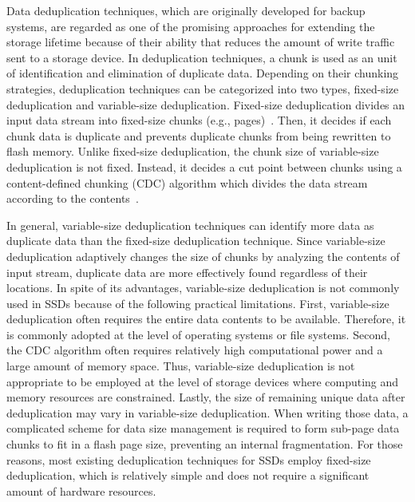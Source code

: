 Data deduplication techniques, which are originally developed for backup systems,
are regarded as one of the promising approaches for extending the storage lifetime
because of their ability that reduces the amount of write traffic sent to a storage device.
In deduplication techniques, a chunk is used as an unit of identification and elimination of duplicate data.
Depending on their chunking strategies, deduplication techniques can be categorized into two types,
fixed-size deduplication and variable-size deduplication.
Fixed-size deduplication divides an input data stream into fixed-size chunks (e.g., pages)~\cite{caftl,value-locality}. %
Then, it decides if each chunk data is duplicate and prevents duplicate chunks %
from being rewritten to flash memory.
Unlike fixed-size deduplication, 
the chunk size of variable-size deduplication is not fixed.
Instead, it decides a cut point between chunks using 
a content-defined chunking (CDC) algorithm
which divides the data stream according to the contents~\cite{dedupv1, dong}.

In general, variable-size deduplication techniques can identify more data as duplicate data than the fixed-size deduplication technique.
Since variable-size deduplication adaptively changes the size of chunks by analyzing the contents of input stream,
duplicate data are more effectively found regardless of their locations.
In spite of its advantages, variable-size deduplication is not commonly used in SSDs because of the following practical limitations.
First, variable-size deduplication often requires
the entire data contents to be available.
Therefore, it is commonly adopted at the level of operating systems or file systems.
Second, the CDC algorithm often requires relatively high computational power and a large amount of memory space.
Thus, variable-size deduplication is not appropriate to be employed at the level of storage devices
where computing and memory resources are constrained.
Lastly, the size of remaining unique data after deduplication may vary in variable-size deduplication.
When writing those data, a complicated scheme for data size management is required to form sub-page
data chunks to fit in a flash page size, preventing an internal fragmentation.
For those reasons, most existing deduplication techniques for SSDs employ fixed-size deduplication, 
which is relatively simple and does not require a significant amount of hardware resources.

